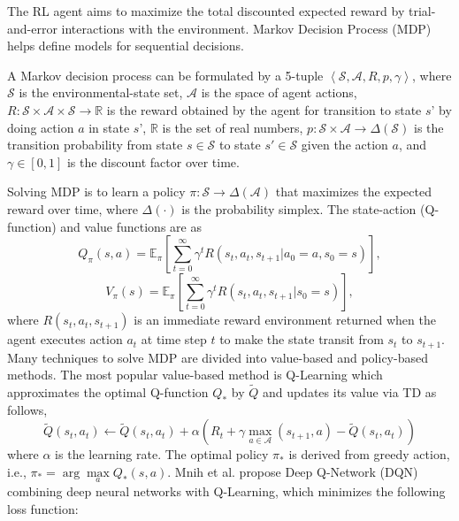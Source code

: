 \documentclass[acmsmall]{acmart}
\begin{document}
The RL agent aims to maximize the total discounted expected reward by trial-and-error interactions with the environment. Markov Decision Process (MDP) helps define models for sequential decisions.
\begin{definition}[MDP]
A Markov decision process can be formulated by a 5-tuple $\left<\mathcal{S}, \mathcal{A}, R, p, \gamma\right>$, where $\mathcal{S}$ is the environmental-state set, $\mathcal{A}$ is the space of agent actions, $R:\mathcal{S}\times\mathcal{A}\times\mathcal{S}\rightarrow\mathbb{R}$ is the reward obtained by the agent for transition to state $s’$ by doing action $a$ in state $s’$, $\mathbb R$ is the set of real numbers, $p: \mathcal{S}\times\mathcal{A}\rightarrow \Delta\left(\mathcal{S}\right)$ is the transition probability from state $s\in \mathcal{S}$ to state $s' \in \mathcal{S}$ given the action $a$, and $\gamma \in \left[0,1\right]$ is the discount factor over time. 
\end{definition}
Solving MDP is to learn a policy $\pi:\mathcal{S}\rightarrow \Delta\left(\mathcal{A}\right)$ that maximizes the expected reward over time, where $\Delta\left(\cdot\right)$ is the probability simplex. The state-action (Q-function) and value functions are as 
\begin{equation} \label{q}
    Q_{\pi}\left(s, a\right) = \mathbb E_{\pi}\left[\sum_{t=0}^\infty \gamma^tR\left(s_t,a_t,s_{t+1}|a_0 = a, s_0 = s\right)\right],
\end{equation}
\begin{equation} \label{v}
    V_{\pi}\left(s\right) = \mathbb E_{\pi}\left[\sum_{t=0}^\infty \gamma^tR\left(s_t,a_t,s_{t+1}|s_0 = s\right)\right],
\end{equation}
where $R\left(s_t,a_t,s_{t+1}\right)$ is an immediate reward environment returned when the agent executes action $a_t$ at time step $t$ to make the state transit from $s_t$ to $s_{t+1}$.
Many techniques to solve MDP are divided into value-based and policy-based methods. The most popular value-based method is Q-Learning \cite{sutton2018reinforcement} which approximates the optimal Q-function $Q_*$ by $\tilde Q$ and updates its value via TD as follows,
\begin{equation} \label{uq}
    \tilde Q\left(s_t,a_t\right)\leftarrow \tilde Q\left(s_t,a_t\right) + \alpha \left(R_t + \gamma \mathop {max}\limits_{a\in \mathcal{A}}\left(s_{t+1}, a\right) - \tilde Q\left(s_t,a_t\right)\right)
\end{equation}
where $\alpha$ is the learning rate. The optimal policy $\pi_*$ is derived from greedy action, i.e., $\pi_* = \mathop{arg} \mathop{max}\limits_a Q_*\left(s,a\right)$. Mnih et al. \cite{dqn2013, dqn} propose Deep Q-Network (DQN) combining deep neural networks with Q-Learning, which minimizes the following loss function:
\end{document}
